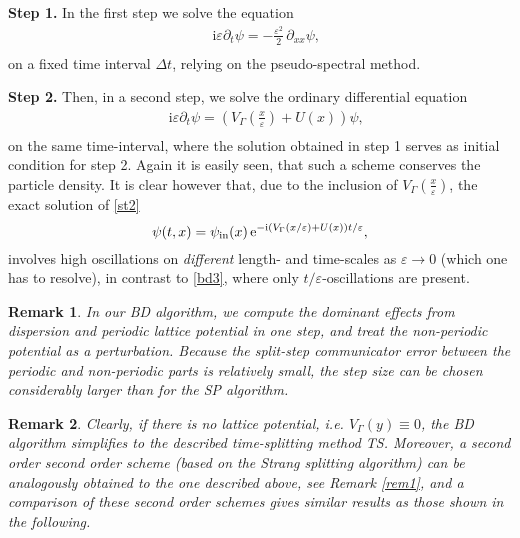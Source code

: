 \documentclass[leqno,final]{siamltex}
\newtheorem{remark}{Remark}[section]
\numberwithin{equation}{section}
\newcounter{me}
\begin{document}
\textbf{Step 1.} In the first step we solve the equation
\begin{equation}
\label{st1}
\begin{aligned}
&\, {\mathrm{i}} {{\varepsilon }} \partial _t\psi = -\frac{{{\varepsilon }}^2}{2}\, {\partial}_{xx}\psi, \\
\end{aligned}
\end{equation}
on a fixed time interval $\Delta t$, relying on the
pseudo-spectral method.
{\par}
\textbf{Step 2.} Then, in a second step, we solve the ordinary
differential equation
\begin{equation}
\label{st2}
\begin{aligned}
& \,{\mathrm{i}} {{\varepsilon }} \partial _t\psi  = \left(V_{\Gamma} \left({\frac{{x}}{{{\varepsilon }}}}\right)
+ U(x) \right)\psi, \\
\end{aligned}
\end{equation}
on the same time-interval, where the solution obtained in step 1
serves as initial condition for step 2. Again it is easily seen,
that such a scheme conserves the particle density. It is clear
however that, due to the inclusion of
$V_\Gamma\left({\frac{{x}}{{{\varepsilon }}}}\right)$, the exact solution of
\eqref{st2} \begin{equation} \psi(t,x)=\psi_{\rm in}(x)\,{\mathrm{e}}^{-{\mathrm{i}} \left(V_{\Gamma}
(x/{{\varepsilon }})+ U(x) \right) t/{{\varepsilon }}}, \end{equation} involves high oscillations on
\emph{different} length- and time-scales as ${{\varepsilon }}\to 0$ (which one
has to resolve), in contrast to \eqref{bd3}, where only
$t/{{\varepsilon }}$-oscillations are present.

\begin{remark}\label{rmk_comparison}
In our BD algorithm, we compute the dominant effects from
dispersion and periodic lattice potential in one step, and treat
the non-periodic potential as a perturbation. Because the
split-step communicator error between the periodic and
non-periodic parts is relatively small, the step size can be
chosen considerably larger than for the SP algorithm.
\end{remark}

\begin{remark}\label{rmk_no_lattice}
Clearly, if there is no lattice potential, {{\sl i.e.\/ }} $V_{\Gamma}(y)\equiv 0$,
the BD algorithm simplifies to the described time-splitting method
TS. Moreover, a second order second order scheme (based on the
Strang splitting algorithm) can be analogously obtained to the one
described above, see Remark \ref{rem1}, and a comparison of these
second order schemes gives similar results as those shown in the
following.
\end{remark}
\end{document}
